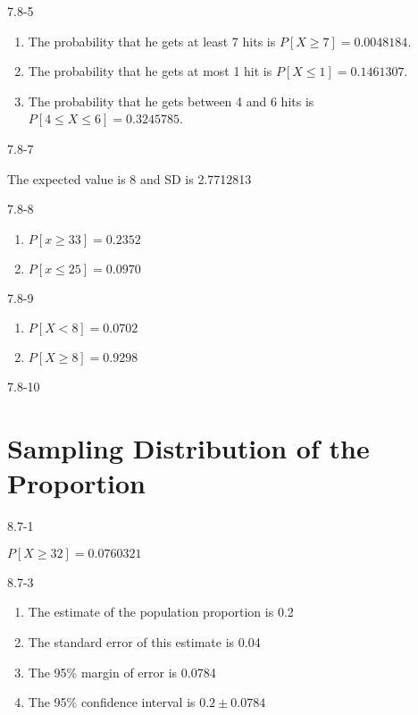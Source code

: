 \begin{exsol@solution}{7.8-5}

\begin{enumerate}
\item The probability that he gets at least 7 hits is $P[X \ge 7] = 0.0048184$.
\item The probability that he gets at most 1 hit is $P[X \le 1] = 0.1461307$.
\item The probability that he gets between 4 and 6 hits is $P[4 \le X \le 6] = 0.3245785$.
\end{enumerate}

\end{exsol@solution}
\begin{exsol@solution}{7.8-7}

The expected value is 8 and SD is 2.7712813
\end{exsol@solution}
\begin{exsol@solution}{7.8-8}



\begin{enumerate}
\item $P[ x \ge 33] = 0.2352$
\item $P[ x \le 25] = 0.0970$
\end{enumerate}

\end{exsol@solution}
\begin{exsol@solution}{7.8-9}
\begin{enumerate}
\item $P[ X < 8 ] = 0.0702$
\item $P[ X \ge 8 ] = 0.9298$
\end{enumerate}

\end{exsol@solution}
\begin{exsol@solution}{7.8-10}

\end{exsol@solution}
\setcounter{chapter}{7}\chapter{Sampling Distribution of the Proportion}
\begin{exsol@solution}{8.7-1}

    $P[ X \ge 32 ] = 0.0760321$
\end{exsol@solution}
\begin{exsol@solution}{8.7-3}
\begin{enumerate}
\item The estimate of the population proportion is 0.2
\item The standard error of this estimate is 0.04
\item The 95\% margin of error is 0.0784
\item The 95\% confidence interval is $0.2 \pm 0.0784$
\end{enumerate}

\end{exsol@solution}
